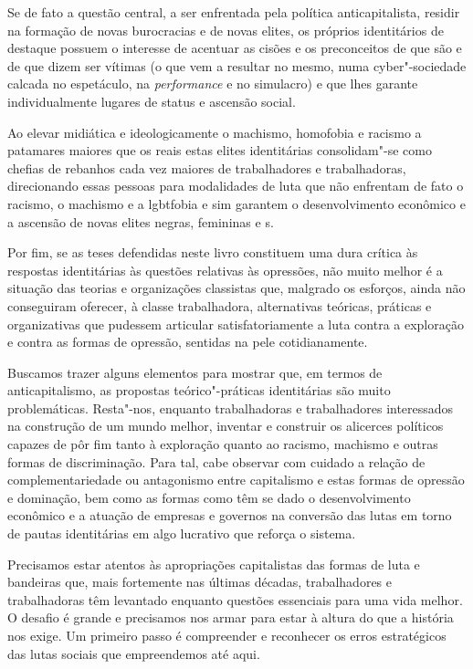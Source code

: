 Se de fato a questão central, a ser enfrentada pela política
anticapitalista, residir na formação de novas burocracias e de novas
elites, os próprios identitários de destaque possuem o interesse de
acentuar as cisões e os preconceitos de que são e de que dizem ser
vítimas (o que vem a resultar no mesmo, numa cyber"-sociedade calcada no
espetáculo, na \emph{performance} e no simulacro) e que lhes garante
individualmente lugares de status e ascensão social.

Ao elevar midiática e ideologicamente o machismo, homofobia e racismo a
patamares maiores que os reais estas elites identitárias consolidam"-se
como chefias de rebanhos cada vez maiores de trabalhadores e
trabalhadoras, direcionando essas pessoas para modalidades de luta que
não enfrentam de fato o racismo, o machismo e a lgbtfobia e sim garantem
o desenvolvimento econômico e a ascensão de novas elites negras,
femininas e s.

Por fim, se as teses defendidas neste livro constituem uma dura crítica
às respostas identitárias às questões relativas às opressões, não muito
melhor é a situação das teorias e organizações classistas que, malgrado
os esforços, ainda não conseguiram oferecer, à classe trabalhadora,
alternativas teóricas, práticas e organizativas que pudessem articular
satisfatoriamente a luta contra a exploração e contra as formas de
opressão, sentidas na pele cotidianamente.

Buscamos trazer alguns elementos para mostrar que, em termos de
anticapitalismo, as propostas teórico"-práticas identitárias são muito
problemáticas. Resta"-nos, enquanto trabalhadoras e trabalhadores
interessados na construção de um mundo melhor, inventar e construir os
alicerces políticos capazes de pôr fim tanto à exploração quanto ao
racismo, machismo e outras formas de discriminação. Para tal, cabe
observar com cuidado a relação de complementariedade ou antagonismo
entre capitalismo e estas formas de opressão e dominação, bem como as
formas como têm se dado o desenvolvimento econômico e a atuação de
empresas e governos na conversão das lutas em torno de pautas
identitárias em algo lucrativo que reforça o sistema.

Precisamos estar atentos às apropriações capitalistas das formas de luta
e bandeiras que, mais fortemente nas últimas décadas, trabalhadores e
trabalhadoras têm levantado enquanto questões essenciais para uma vida
melhor. O desafio é grande e precisamos nos armar para estar à altura do
que a história nos exige. Um primeiro passo é compreender e reconhecer
os erros estratégicos das lutas sociais que empreendemos até aqui.

